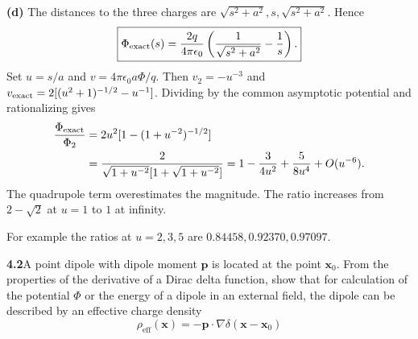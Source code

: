 \textbf{(d)} The distances to the three charges are
$\sqrt{s^2+a^2},s,\sqrt{s^2+a^2}$. Hence
\[
\boxed{\Phi_{\rm exact}(s)=\frac{2q}{4\pi\epsilon_0}
\left(\frac{1}{\sqrt{s^2+a^2}}-\frac1s\right).}
\]
Set $u=s/a$ and $v=4\pi\epsilon_0a\Phi/q$. Then
$v_2=-u^{-3}$ and $v_{\rm exact}=2[(u^2+1)^{-1/2}-u^{-1}]$.
Dividing by the common asymptotic potential and rationalizing gives
\begin{align*}
\frac{\Phi_{\rm exact}}{\Phi_2}
&=2u^2[1-(1+u^{-2})^{-1/2}]\\
&=\frac{2}{\sqrt{1+u^{-2}}[1+\sqrt{1+u^{-2}}]}
=1-\frac{3}{4u^2}+\frac{5}{8u^4}+O(u^{-6}).
\end{align*}
The quadrupole term overestimates the magnitude. The ratio increases
from $2-\sqrt2$ at $u=1$ to $1$ at infinity.
\begin{center}
\hspace{1em}
\end{center}
For example the ratios at $u=2,3,5$ are $0.84458,0.92370,0.97097$.

\par\bigskip
\noindent\textbf{4.2}\quad A point dipole with dipole moment $\mathbf{p}$ is located at the point $\mathbf{x}_{0}$. From the properties of the derivative of a Dirac delta function, show that for calculation of the potential $\Phi$ or the energy of a dipole in an external field, the dipole can be described by an effective charge density
\[
\rho_{\mathrm{eff}}(\mathbf{x})=-\mathbf{p}\cdot\nabla\delta(\mathbf{x}-\mathbf{x}_{0})
\]
\solution

